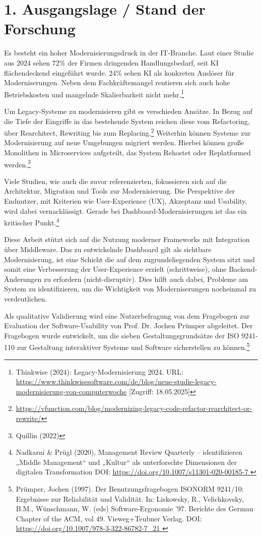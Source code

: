 \section*{1. Ausgangslage / Stand der Forschung}

Es besteht ein hoher Modernisierungsdruck in der IT-Branche. Laut einer Studie aus 2024 sehen 72\% der Firmen dringenden Handlungsbedarf, seit KI flächendeckend eingeführt wurde. 24\% sehen KI als konkreten Auslöser für Moderniserungen. Neben dem Fachkräftemangel rentieren sich auch hohe Betriebskosten und mangelnde Skalierbarkeit nicht mehr.\footnote{Thinkwise (2024): Legacy-Modernisierung 2024. URL: \url{https://www.thinkwisesoftware.com/de/blog/neue-studie-legacy-modernisierung-von-computerwoche} [Zugriff: 18.05.2025]}

Um Legacy-Systeme zu modernisieren gibt es verschieden Ansätze. In Bezug auf die Tiefe der Eingriffe in das bestehende System reichen diese vom Refactoring, über Rearchitect, Rewriting bis zum Replacing.\footnote{\url{https://vfunction.com/blog/modernizing-legacy-code-refactor-rearchitect-or-rewrite/}}
Weiterhin können Systeme zur Modernisierung auf neue Umgebungen migriert werden. Hierbei können große Monolithen in Microservices aufgeteilt, das System Rehostet oder Replatformed werden.\footnote{Quillin (2022)}

Viele Studien, wie auch die zuvor referenzierten, fokussieren sich auf die Architektur, Migration und Tools zur Modernisierung. Die Perspektive der Endnutzer, mit Kriterien wie User-Experience (UX), Akzeptanz und Usability, wird dabei vernachlässigt. Gerade bei Dashboard-Modernisierungen ist das ein kritischer Punkt.\footnote{Nadkarni \& Prügl (2020), Management Review Quarterly – identifizieren „Middle Management“ und „Kultur“ als unterforschte Dimensionen der digitalen Transformation DOI: \url{https://doi.org/10.1007/s11301-020-00185-7 }}

Diese Arbeit stützt sich auf die Nutzung moderner Frameworks mit Integration über Middleware. Das zu entwickelnde Dashboard gilt als sichtbare Modernisierung, ist eine Schicht die auf dem zugrundeliegenden System sitzt und somit eine Verbesserung der User-Experience erzielt (schrittweise), ohne Backend-Änderungen zu erfordern (nicht-disruptiv). Dies hilft auch dabei, Probleme am System zu identifizieren, um die Wichtigkeit von Moderniserungen nocheinmal zu verdeutlichen.

Als qualitative Validierung wird eine Nutzerbefragung von dem Fragebogen zur Evaluation der Software-Usability von Prof. Dr. Jochen Prümper abgeleitet. Der Fragebogen wurde entwickelt, um die sieben Gestaltungsgrundsätze der ISO 9241-110 zur Gestaltung interaktiver Systeme und Software sicherstellen zu können.\footnote{Prümper, Jochen (1997). Der Benutzungsfragebogen ISONORM 9241/10: Ergebnisse zur Reliabilität und Validität. In: Liskowsky, R., Velichkovsky, B.M., Wünschmann, W. (eds) Software-Ergonomie ’97. Berichte des German Chapter of the ACM, vol 49. Vieweg+Teubner Verlag. DOI: \url{https://doi.org/10.1007/978-3-322-86782-7_21 }}
